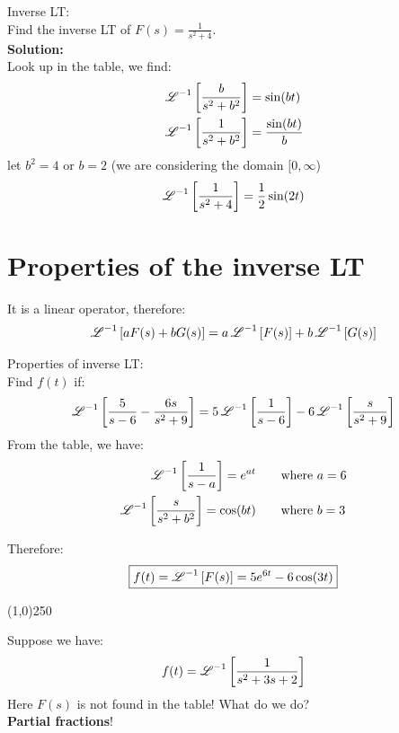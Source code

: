 \begin{exmp}{Inverse LT:}\\
Find the inverse LT of $F(s)=\frac{1}{s^2+4}$.\\
\textbf{Solution:}\\
Look up in the table, we find:
\begin{align*}
&\operatorname{\mathscr{L}}^{-1}\left[\frac{b}{s^2+b^2}\right]=\sin(b t)\\
&\operatorname{\mathscr{L}}^{-1}\left[\frac{1}{s^2+b^2}\right]=\frac{\sin(b t)}{b}
\end{align*}
let $b^2=4$ or $b=2$ (we are considering the domain $[0,\infty$)
\begin{align*}
\operatorname{\mathscr{L}}^{-1}\left[\frac{1}{s^{2}+4}\right]=\frac{1}{2}\sin(2t)
\end{align*}

\end{exmp}

\section{Properties of the inverse LT}
It is a linear operator, therefore:
\begin{align*}
\operatorname{\mathscr{L}}^{-1}\left[aF(s)+bG(s)\right]=a\operatorname{\mathscr{L}}^{-1}\left[F(s)\right]+b\operatorname{\mathscr{L}}^{-1}\left[G(s)\right]
\end{align*}

\begin{exmp}{Properties of inverse LT:}\\
Find $f(t)$ if:
\begin{align*}
\operatorname{\mathscr{L}}^{-1}\left[\frac{5}{s-6}-\frac{6s}{s^2+9}\right]=5\operatorname{\mathscr{L}}^{-1}\left[\frac{1}{s-6}\right]-6\operatorname{\mathscr{L}}^{-1}\left[\frac{s}{s^2+9}\right]
\end{align*}
From the table, we have:
\begin{align*}
\operatorname{\mathscr{L}}^{-1}\left[\frac{1}{s-a}\right]=e^{at} \qquad \text{where } &a=6\\
\operatorname{\mathscr{L}}^{-1}\left[\frac{s}{s^2+b^2}\right]=\cos(bt) \qquad \text{where } & b=3
\end{align*}

Therefore:
\begin{align*}
\boxed{f(t)=\operatorname{\mathscr{L}}^{-1}\left[F(s)\right]=5e^{6t} -6\cos(3t)}
\end{align*}
\end{exmp}

\begin{center}
\line(1,0){250}
\end{center}

Suppose we have:
\begin{align*}
f(t)=\operatorname{\mathscr{L}}^{-1}\left[\frac{1}{s^2+3s+2}\right]
\end{align*}
Here $F(s)$ is not found in the table! What do we do?\\
\textbf{Partial fractions}!\\

